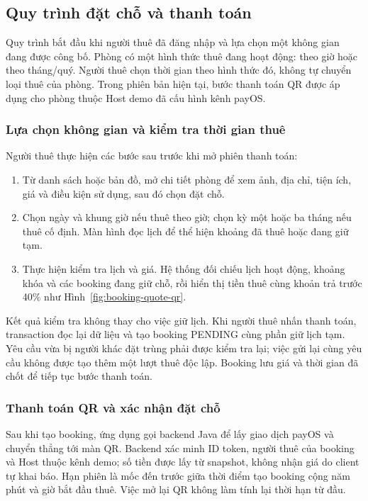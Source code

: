 \subsection{Quy trình đặt chỗ và thanh toán}
\label{sec:execution-booking-payment}

Quy trình bắt đầu khi người thuê đã đăng nhập và lựa chọn một không gian đang được công bố. Phòng có một hình thức thuê đang hoạt động: theo giờ hoặc theo tháng/quý. Người thuê chọn thời gian theo hình thức đó, không tự chuyển loại thuê của phòng. Trong phiên bản hiện tại, bước thanh toán QR được áp dụng cho phòng thuộc Host demo đã cấu hình kênh payOS.

\subsubsection{Lựa chọn không gian và kiểm tra thời gian thuê}
Người thuê thực hiện các bước sau trước khi mở phiên thanh toán:
\begin{enumerate}
\item Từ danh sách hoặc bản đồ, mở chi tiết phòng để xem ảnh, địa chỉ, tiện ích, giá và điều kiện sử dụng, sau đó chọn đặt chỗ.
\item Chọn ngày và khung giờ nếu thuê theo giờ; chọn kỳ một hoặc ba tháng nếu thuê cố định. Màn hình đọc lịch để thể hiện khoảng đã thuê hoặc đang giữ tạm.
\item Thực hiện kiểm tra lịch và giá. Hệ thống đối chiếu lịch hoạt động, khoảng khóa và các booking đang giữ chỗ, rồi hiển thị tiền thuê cùng khoản trả trước 40\% như Hình~\ref{fig:booking-quote-qr}.
\end{enumerate}

Kết quả kiểm tra không thay cho việc giữ lịch. Khi người thuê nhấn thanh toán, transaction đọc lại dữ liệu và tạo booking PENDING cùng phần giữ lịch tạm. Yêu cầu vừa bị người khác đặt trùng phải được kiểm tra lại; việc gửi lại cùng yêu cầu không được tạo thêm một lượt thuê độc lập. Booking lưu giá và thời gian đã chốt để tiếp tục bước thanh toán.

\subsubsection{Thanh toán QR và xác nhận đặt chỗ}
Sau khi tạo booking, ứng dụng gọi backend Java để lấy giao dịch payOS và chuyển thẳng tới màn QR. Backend xác minh ID token, người thuê của booking và Host thuộc kênh demo; số tiền được lấy từ snapshot, không nhận giá do client tự khai báo. Hạn phiên là mốc đến trước giữa thời điểm tạo booking cộng năm phút và giờ bắt đầu thuê. Việc mở lại QR không làm tính lại thời hạn từ đầu.

